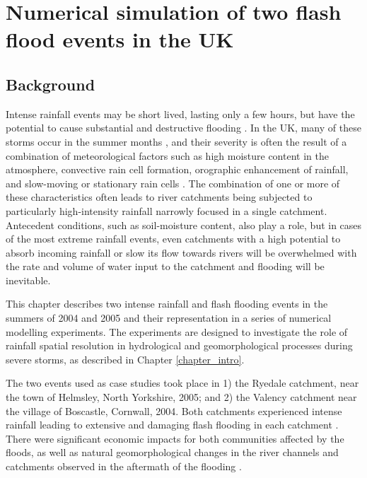 \chapter{Numerical simulation of two flash flood events in the UK}
\label{chapter_events}

\section{Background}
Intense rainfall events may be short lived, lasting only a few hours, but have the potential to cause substantial and destructive flooding \citep{lane2008climate,pitt2008pitt}. In the UK, many of these storms occur in the summer months \citep{Kendon2014}, and their severity is often the result of a combination of meteorological factors such as high moisture content in the atmosphere, convective rain cell formation, orographic enhancement of rainfall, and slow-moving or stationary rain cells \citep{Barros1994,golding2005boscastle,sibley2009analysis,warren2014boscastle}. The combination of one or more of these characteristics often leads to river catchments being subjected to particularly high-intensity rainfall narrowly focused in a single catchment. Antecedent conditions, such as soil-moisture content, also play a role, but in cases of the most extreme rainfall events, even catchments with a high potential to absorb incoming rainfall or slow its flow towards rivers will be overwhelmed with the rate and volume of water input to the catchment and flooding will be inevitable.

This chapter describes two intense rainfall and flash flooding events in the summers of 2004 and 2005 and their representation in a series of numerical modelling experiments. The experiments are designed to investigate the role of rainfall spatial resolution in hydrological and geomorphological processes during severe storms, as described in Chapter \ref{chapter_intro}. %

The two events used as case studies took place in 1) the Ryedale catchment, near the town of Helmsley, North Yorkshire, 2005; and  2) the Valency catchment near the village of Boscastle, Cornwall, 2004. Both catchments experienced intense rainfall leading to extensive and damaging flash flooding in each catchment \citep{golding2005boscastle,sibley2009analysis}. There were significant economic impacts for both communities affected by the floods, as well as natural geomorphological changes in the river channels and catchments observed in the aftermath of the flooding \citep{wallingford2005flooding,wass2008investigation}.

